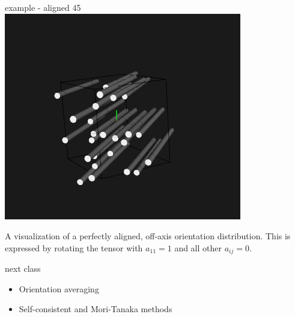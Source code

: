 \documentclass[
  letterpaper,
  ignorenonframetext,
  aspectratio=43,
  handout,
  12pt]{beamer}
\providecommand{\tightlist}{%
  \setlength{\itemsep}{0pt}\setlength{\parskip}{0pt}}
\providecommand{\tightlist}{%
\setlength{\itemsep}{0pt}\setlength{\parskip}{0pt}}
\let\Oldincludegraphics\includegraphics
\renewcommand{\includegraphics}[2][]{\Oldincludegraphics[width=\textwidth,height=0.7\textheight,keepaspectratio]{#2}}
\begin{document}
\begin{frame}{example - aligned 45}
\protect\hypertarget{example---aligned-45}{}
\includegraphics{../images/aligned45.PNG}

A visualization of a perfectly aligned, off-axis orientation
distribution. This is expressed by rotating the tensor with
\(a_{11} = 1\) and all other \(a_{ij} = 0\).
\end{frame}

\begin{frame}{next class}
\protect\hypertarget{next-class}{}
\begin{itemize}
\tightlist
\item
  Orientation averaging
\item
  Self-consistent and Mori-Tanaka methods
\end{itemize}
\end{frame}
\end{document}
